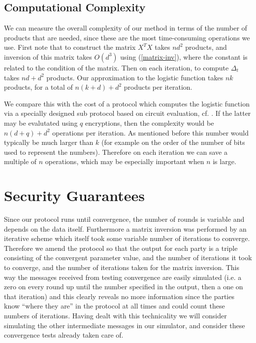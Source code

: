 \documentclass[11pt]{article}
\begin{document}
\subsection{Computational Complexity}

We can measure the overall complexity of our method in terms of the number of products that are needed, since these are the most time-consuming operations we use.  First note that to construct the matrix $X^TX$ takes $nd^2$ products, and inversion of this matrix takes $O(d^3)$ using (\ref{matrix-inv}), where the constant is related to the condition of the matrix.  Then on each iteration, to compute $\Delta_t$ takes $nd + d^2$ products.  Our approximation to the logistic function takes $nk$ products, for a total of $n(k+d) + d^2$ products per iteration.


We compare this with the cost of a protocol which computes the logistic function via a specially designed sub protocol based on circuit evaluation, cf. \citet{yao82}.  If the latter may be evalutated using $q$ encryptions, then the complexity would be $n(d+q) + d^2$ operations per iteration.  As mentioned before this number would typically be much larger than $k$ (for example on the order of the number of bits used to represent the numbers).  Therefore on each iteration we can save a multiple of $n$ operations, which may be especially important when $n$ is large.


\section{Security Guarantees}\label{sec:security}

Since our protocol runs until convergence, the number of rounds is variable and depends on the data itself.  Furthermore a matrix inversion was performed by an iterative scheme which itself took some variable number of iterations to converge.  Therefore we amend the protocol so that the output for each party is a triple consisting of the convergent parameter value, and the number of iterations it took to converge, and the number of iterations taken for the matrix inversion.  This way the messages received from testing convergence are easily simulated (i.e. a zero on every round up until the number specified in the output, then a one on that iteration) and this clearly reveals no more information since the parties know ``where they are'' in the protocol at all times and  could count these numbers of iterations.  Having dealt with this technicality we will consider simulating the other intermediate messages in our simulator, and consider these convergence tests already taken care of.
\end{document}
